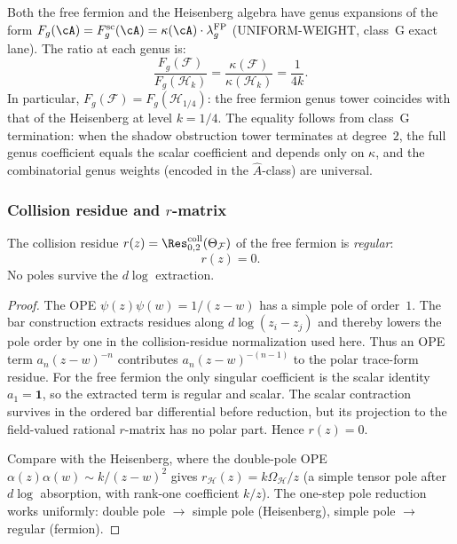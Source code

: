 \begin{remark}
\label{rem:fermion-vs-heisenberg-genus}
Both the free fermion and the Heisenberg algebra have genus expansions
of the form
$F_g(\cA)=F_g^{\mathrm{sc}}(\cA)
=\kappa(\cA) \cdot \lambda_g^{\mathrm{FP}}$
\textup{(}UNIFORM-WEIGHT, class~G exact lane\textup{)}. The ratio at
each genus is:
\[
\frac{F_g(\mathcal{F})}{F_g(\mathcal{H}_k)}
= \frac{\kappa(\mathcal{F})}{\kappa(\mathcal{H}_k)}
= \frac{1}{4k}.
\]
In particular, $F_g(\mathcal{F}) = F_g(\mathcal{H}_{1/4})$: the free
fermion genus tower coincides with that of the Heisenberg at level
$k = 1/4$. The equality follows from
class~G termination: when the shadow obstruction tower terminates at degree~$2$,
the full genus coefficient equals the scalar coefficient and depends
only on $\kappa$, and the combinatorial
genus weights (encoded in the $\hat{A}$-class) are universal.
\end{remark}

\subsubsection{Collision residue and $r$-matrix}
\label{sec:fermion-rmatrix}%
%

\begin{proposition}
\label{prop:fermion-rmatrix}
The collision residue $r(z) = \Res^{\mathrm{coll}}_{0,2}(\Theta_{\mathcal{F}})$ of the free fermion is \emph{regular}:
\begin{equation}\label{eq:fermion-rmatrix}
r(z) = 0.
\end{equation}
No poles survive the $d\log$ extraction.
\end{proposition}

\begin{proof}
The OPE $\psi(z)\psi(w) = 1/(z-w)$ has a simple pole of order~$1$.
The bar construction extracts residues along $d\log(z_i - z_j)$
and thereby lowers the pole order by one in the collision-residue
normalization used here. Thus an OPE term $a_n(z-w)^{-n}$
contributes $a_n(z-w)^{-(n-1)}$ to the polar trace-form residue. For
the free fermion the only singular coefficient is the scalar identity
$a_1=\mathbf 1$, so the extracted term is regular and scalar. The
scalar contraction survives in the ordered bar differential before
reduction, but its projection to the field-valued rational $r$-matrix
has no polar part. Hence $r(z)=0$.

Compare with the Heisenberg, where the double-pole OPE
$\alpha(z)\alpha(w) \sim k/(z-w)^2$ gives
$r_{\mathcal H}(z)=k\Omega_{\mathcal H}/z$ (a simple tensor pole after
$d\log$ absorption, with rank-one coefficient $k/z$).
The one-step pole reduction works uniformly: double pole
$\to$ simple pole (Heisenberg), simple pole $\to$ regular (fermion).
\end{proof}

